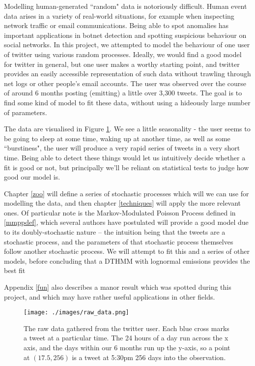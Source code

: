 Modelling human-generated ``random" data is notoriously difficult. Human event data arises in a variety of real-world situations, for example when inspecting network traffic or email communications. Being able to spot anomalies has important applications in botnet detection and spotting suspicious behaviour on social networks. In this project, we attempted to model the behaviour of one user of twitter using various random processes. Ideally, we would find a good model for twitter in general, but one user makes a worthy starting point, and twitter provides an easily accessible representation of such data without trawling through net logs or other people's email accounts. The user was observed over the course of around 6 months posting (emitting) a little over 3,300 tweets. The goal is to find some kind of model to fit these data, without using a hideously large number of parameters.

The data are visualised in Figure \ref{raw_data}. We see a little seasonality - the user seems to be going to sleep at some time, waking up at another time, as well as some ``burstiness", the user will produce a very rapid series of tweets in a very short time. Being able to detect these things would let us intuitively decide whether a fit is good or not, but principally we'll be reliant on statistical tests to judge how good our model is.

Chapter \ref{zoo} will define a series of stochastic processes which will we can use for modelling the data, and then chapter \ref{techniques} will apply the more relevant ones. Of particular note is the Markov-Modulated Poisson Process defined in \textsection\ref{mmppdef}, which several authors \cite{mmpp1}\cite{mmpp2}\cite{mmpp3} have postulated will provide a good model due to its doubly-stochastic nature -- the intuition being that the tweets are a stochastic process, and the parameters of that stochastic process themselves follow another stochastic process. We will attempt to fit this and a series of other models, before concluding that a DTHMM with lognormal emissions provides the best fit

Appendix \ref{fun} also describes a manor result which was spotted during this project, and which may have rather useful applications in other fields.

\begin{figure}[h]
\centering
\texttt{[image: ./images/raw\_data.png]}
\caption{The raw data gathered from the twitter user. Each blue cross marks a tweet at a particular time. The 24 hours of a day run across the x axis, and the days within our 6 months run up the y-axis, so a point at $(17.5, 256)$ is a tweet at 5:30pm 256 days into the observation.}
\label{raw_data}
\end{figure}